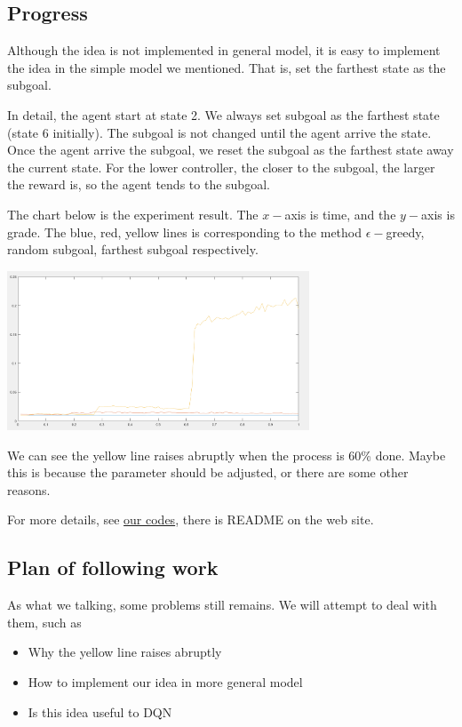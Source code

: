 \documentclass{article}
\begin{document}
\begin{spacing}{1.1}
    \subsection{Progress}

    Although the idea is not implemented in general model, it is easy to implement the idea in the simple model we mentioned. That is, set the farthest state as the subgoal.

    In detail, the agent start at state 2. We always set subgoal as the farthest state (state 6 initially). The subgoal is not changed until the agent arrive the state. Once the agent arrive the subgoal, we reset the subgoal as the farthest state away the current state. For the lower controller, the closer to the subgoal, the larger the reward is, so the agent tends to the subgoal.

    The chart below is the experiment result. The $x-$axis is time, and the $y-$axis is grade. The blue, red, yellow lines is corresponding to the method $\epsilon-$greedy, random subgoal, farthest subgoal respectively.

    \includegraphics[width=90mm]{1.png}

    We can see the yellow line raises abruptly when the process is 60\% done. Maybe this is because the parameter should be adjusted, or there are some other reasons.
    
    For more details, see \href{https://github.com/faebdc/AI-Project}{our codes}, there is README on the web site.

    \subsection{Plan of following work}

    As what we talking, some problems still remains. We will attempt to deal with them, such as
    \begin{itemize}
        \item Why the yellow line raises abruptly
        \item How to implement our idea in more general model
        \item Is this idea useful to DQN
    \end{itemize}


\end{spacing}
\end{document}
